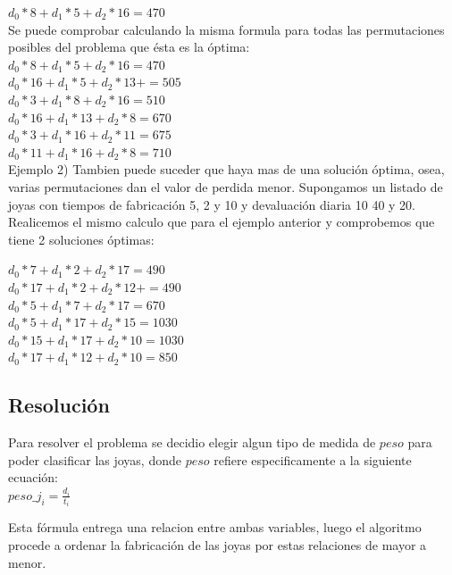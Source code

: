 $d_{0}*8 + d_{1}*5 + d_{2}*16 = 470$ \\

Se puede comprobar calculando la misma formula para todas las permutaciones posibles del problema que \'esta es la \'optima: \\

$d_{0}*8 + d_{1}*5 + d_{2}*16 = 470$ \\
$d_{0}*16 + d_{1}*5 + d_{2}*13 +  = 505$ \\
$d_{0}*3 + d_{1}*8 + d_{2}*16 = 510$ \\
$d_{0}*16 + d_{1}*13 + d_{2}*8 = 670$ \\
$d_{0}*3 + d_{1}*16 + d_{2}*11 = 675$ \\
$d_{0}*11 + d_{1}*16 + d_{2}*8 = 710$ \\

Ejemplo 2) Tambien puede suceder que haya mas de una soluci\'on \'optima, osea, varias permutaciones dan el valor de perdida menor. Supongamos un listado de joyas con tiempos de fabricaci\'on 5, 2 y 10 y devaluaci\'on diaria 10 40 y 20. \\

Realicemos el mismo calculo que para el ejemplo anterior y comprobemos que tiene 2 soluciones \'optimas:

$d_{0}*7 + d_{1}*2 + d_{2}*17 = 490$ \\
$d_{0}*17 + d_{1}*2 + d_{2}*12 +  = 490$ \\
$d_{0}*5 + d_{1}*7 + d_{2}*17 = 670$ \\
$d_{0}*5 + d_{1}*17 + d_{2}*15 = 1030$ \\
$d_{0}*15 + d_{1}*17 + d_{2}*10 = 1030$ \\
$d_{0}*17 + d_{1}*12 + d_{2}*10 = 850$ \\

\subsection{Resoluci\'on}

Para resolver el problema se decidio elegir algun tipo de medida de $peso$ para poder clasificar las joyas, donde $peso$ refiere especificamente a la siguiente ecuaci\'on: \\

$peso\_j_{i} = \frac{d_{i}}{t_{i}}$

Esta f\'ormula entrega una relacion entre ambas variables, luego el algoritmo procede a ordenar la fabricaci\'on de las joyas por estas relaciones de mayor a menor. \\

